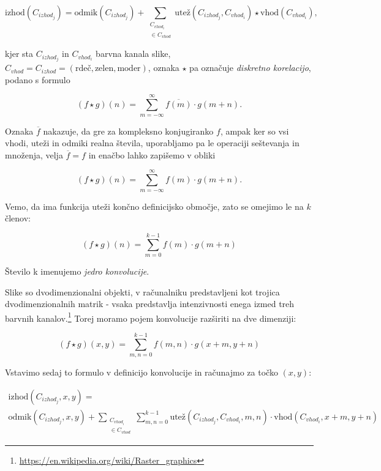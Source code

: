 \documentclass[a4paper,11pt]{article}
\begin{document}
\begin{equation*}
\text{izhod}(C_{izhod_j}) =
	\text{odmik}(C_{izhod_j}) + \sum_{\substack{C_{vhod_i} \\ \in C_{vhod}}} \text{utež}(C_{izhod_j}, C_{vhod_i}) \star \text{vhod}(C_{vhod_i}) \text{,}
\end{equation*}

kjer sta $C_{izhod_j}$ in $C_{vhod_i}$ barvna kanala slike, $C_{vhod} = C_{izhod} = (\text{rdeč}, \text{zelen}, \text{moder})$,
	oznaka $\star$ pa označuje \emph{diskretno korelacijo}, podano s formulo

\begin{equation*}
(f\star g) (n) = \sum_{m = - \infty}^{\infty} \overline{f(m)} \cdot g(m + n) \text{.}
\end{equation*}

Oznaka $\overline{f}$ nakazuje, da gre za kompleksno konjugiranko $f$, ampak ker so vsi vhodi, uteži in odmiki realna števila,
	uporabljamo pa le operaciji seštevanja in množenja, velja $\overline{f} = f$ in enačbo lahko zapišemo v obliki

\begin{equation*}
(f\star g) (n) = \sum_{m = - \infty}^{\infty} f(m) \cdot g(m + n) \text{.}
\end{equation*}

Vemo, da ima funkcija uteži končno definicijsko območje, zato se omejimo le na $k$ členov:

\begin{equation*}
(f\star g) (n) = \sum_{m = 0}^{k - 1} f(m) \cdot g(m + n)
\end{equation*}

Število k imenujemo \emph{jedro konvolucije}.

Slike so dvodimenzionalni objekti, v računalniku predstavljeni kot trojica dvodimenzionalnih matrik - vsaka predstavlja intenzivnosti
	enega izmed treh barvnih kanalov.\footnote{\url{https://en.wikipedia.org/wiki/Raster\_graphics}}
Torej moramo pojem konvolucije razširiti na dve dimenziji:

\begin{equation*}
(f\star g) (x, y) = \sum_{m, n = 0}^{k - 1} f(m, n) \cdot g(x + m, y + n)
\end{equation*}

Vstavimo sedaj to formulo v definicijo konvolucije in računajmo za točko $(x, y)$:

\begin{multline*}
\text{izhod}(C_{izhod_j}, x, y) = \\
	\text{odmik}(C_{izhod_j}, x, y) + \sum_{\substack{C_{vhod_i} \\ \in C_{vhod}}} \sum_{m, n = 0}^{k - 1}
	\text{utež}(C_{izhod_j}, C_{vhod_i}, m, n) \cdot \text{vhod}(C_{vhod_i}, x + m, y + n)
\end{multline*}
\end{document}

